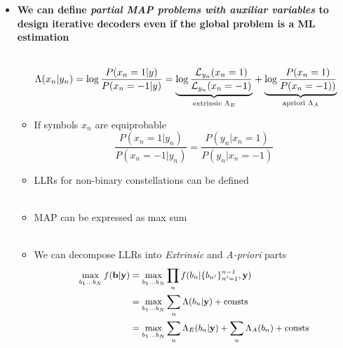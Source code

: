 \documentclass[xcolor=dvipsnames,aspectratio=169]{beamer}
\begin{document}
{\begin{itemize}
        \begin{equation}
            \begin{split}
                \hat{f}^{(i)}(\x|\bb)=&\arg\max_{\bb} f(\hat{\x}^{(i)}|\bb)\\
            \end{split}
        \end{equation}
     \item \textbf{We can define \textit{partial MAP problems with auxiliar variables} to design iterative decoders even if the global problem is a ML estimation}\\ \ \\
         
     \pagebreak   
     \begin{definition}
        $$\Lambda(x_n|y_n)=\log\frac{P(x_n=1|y)}{P(x_n=-1|y)}=\underset{\textnormal{extrinsic }\Lambda_E}{\underbrace{\log\frac{\mathcal{L}_{y_n}(x_n=1)}{\mathcal{L}_{y_n}(x_n=-1)}}}+\underset{\textnormal{apriori }\Lambda_A}{\underbrace{\log\frac{P(x_n=1)}{P(x_n=-1))}}}$$      \end{definition}
        \begin{itemize}
          \item If symbols $x_n$ are equiprobable
            $$\frac{P(x_n=1|y_n)}{P(x_n=-1|y_n)}=\frac{P(y_n|x_n=1)}{P(y_n|x_n=-1)}$$
          \item LLRs for non-binary constellations can be defined\\ \ \\
     \pagebreak
          \item MAP can be expressed as max sum\\ \ \\
          \item We can decompose LLRs into \textit{Extrinsic} and \textit{A-priori} parts
        \begin{equation*}
        \small
         \begin{split}
          \max_{b_1\dots b_N}f(\mathbf{b}|\mathbf{y})&=\max_{b_1\dots b_N}\prod_{n}f(b_n|\{b_{n'}\}_{n'=1}^{n-1},\mathbf{y})\\
                                     &=\max_{b_1\dots b_N}\sum_{n}\Lambda(b_n|\mathbf{y})+\textnormal{consts}\\
                                     &= \max_{b_1\dots b_N}\sum_{n}\Lambda_{E}(b_n|\mathbf{y})+\sum_{n}\Lambda_{A}(b_n)+\textnormal{consts}
         \end{split}
        \end{equation*}  

\end{itemize}
\end{itemize}}
\end{document}
